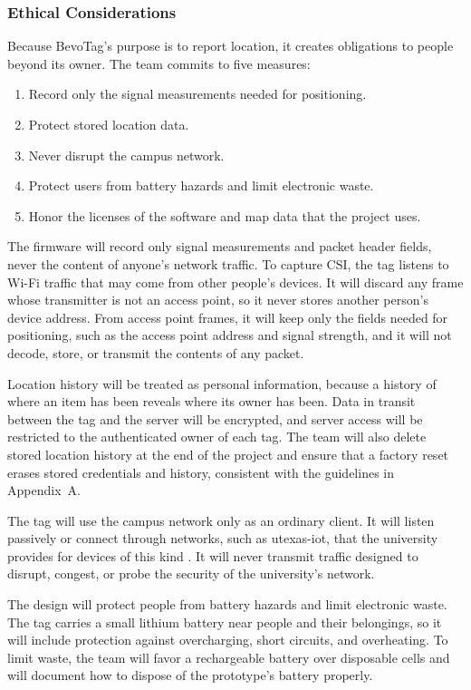 \documentclass[12pt,letterpaper]{article}
\begin{document}
\subsubsection{Ethical Considerations}
Because BevoTag's purpose is to report location, it creates obligations to people beyond its owner.
The team commits to five measures:
\begin{enumerate}
  \item Record only the signal measurements needed for positioning.
  \item Protect stored location data.
  \item Never disrupt the campus network.
  \item Protect users from battery hazards and limit electronic waste.
  \item Honor the licenses of the software and map data that the project uses.
\end{enumerate}

The firmware will record only signal measurements and packet header fields, never the content of
anyone's network traffic. To capture CSI, the tag listens to Wi-Fi traffic that may come from other
people's devices. It will discard any frame whose transmitter is not an access point, so it never
stores another person's device address. From access point frames, it will keep only the fields
needed for positioning, such as the access point address and signal strength, and it will not
decode, store, or transmit the contents of any packet.

Location history will be treated as personal information, because a history of where an item has
been reveals where its owner has been. Data in transit between the tag and the server will be
encrypted, and server access will be restricted to the authenticated owner of each tag. The team
will also delete stored location history at the end of the project and ensure that a factory reset
erases stored credentials and history, consistent with the guidelines in Appendix~A.

The tag will use the campus network only as an ordinary client. It will listen passively or connect
through networks, such as utexas-iot, that the university provides for devices of this kind
\cite{utiot}. It will never transmit traffic designed to disrupt, congest, or probe the security of
the university's network.

The design will protect people from battery hazards and limit electronic waste. The tag carries a
small lithium battery near people and their belongings, so it will include protection against
overcharging, short circuits, and overheating. To limit waste, the team will favor a rechargeable
battery over disposable cells and will document how to dispose of the prototype's battery properly.
\end{document}
